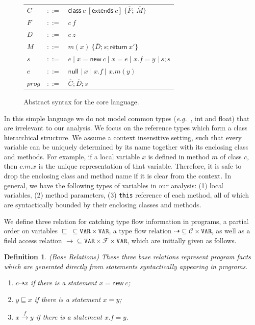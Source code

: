 \documentclass{fac}
\newcommand\eg{\textit{e.g.\ }}
\newtheorem{Definition}{Definition}
\newcommand{\keyword}[1]{\mathsf{#1}}
\newcommand{\kw}[1]{\keyword{#1}}
\newcommand{\kwnull}[0]{\keyword{null}}
\newcommand{\kwnew}[0]{\keyword{new}}
\newcommand{\kwextends}[0]{\keyword{extends}}
\newcommand{\kwclass}[0]{\keyword{class}}
\newcommand\Var{\mathtt{VAR}}
\newcommand{\Class}{\mathcal{C}}
\newcommand{\Field}{\mathcal{F}}
\newcommand{\less}{\sqsubseteq}
\newcommand{\tflow}{\dashrightarrow}
\newcommand{\hflow}{\longrightarrow}
\newcommand{\lhflow}[1]{\stackrel{#1}{\hflow}}
\begin{document}
\begin{figure}\centering
	\begin{tabular}[c]{lll}
		$C$&$::=$&$\kwclass\ c\ [\kwextends\ c] \ \{\overline{F};\ \overline{M}\}$\\
        $F$&$::=$&$c \ f$\\
        $D$&$::=$&$c \ z$\\
		$M$&$::=$&$m(x) \ \{\overline{D}; s; \kw{return}\ x'\}$\\
		$s$&$::=$&$e\mid x{=}\kwnew \ c\mid  x {=} e \mid x.f{=}y \mid s;s$\\

		$e$&$::=$&$ \kwnull\mid x \mid x.f \mid x.m(y) $\\
        $prog$&$::=$&$\overline{C};\overline{D}; s$\\
	\end{tabular}
	\caption{Abstract syntax for the core language. \label{fig:syntax}}
\end{figure}

In this simple language we do not model common types (\eg, int and float) that are irrelevant to our analysis. We focus on the reference types which form a class hierarchical structure. We assume a context insensitive setting, such that every variable can be uniquely determined by its name together with its enclosing class and methods.
For example, if a local variable $x$ is defined in method $m$ of class $c$, then $c.m.x$ is the unique representation of that variable. Therefore, it is safe to drop the enclosing class and method name if it is clear from the context.
In general, we have the following types of variables in our analysis: (1) local variables, (2) method parameters, (3) \texttt{this} reference of each method, all of which are syntactically bounded by their enclosing classes and methods.

We define three relation for catching type flow information in programs, a partial order on variables $\less\ \subseteq\Var\times\Var$, a type flow relation
$\tflow\subseteq\Class\times\Var$, as well as a field access relation $\hflow\subseteq\Var\times\Field\times\Var$,
which are initially given as follows.

\begin{Definition}\label{def:base} (Base Relations)
These three base relations represent program facts which are generated directly %
from statements syntactically appearing in programs.
\begin{enumerate}
  \item $c\tflow x$ if there is a statement $x = \kwnew\ c$;
  \item $y\less x$ if there is a statement $x = y $;
  \item $x\lhflow{f}y$ if there is a statement $x.f = y$.
\end{enumerate}
\end{Definition}
\end{document}
